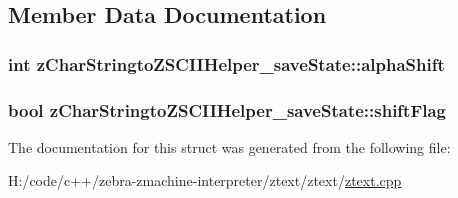 \subsection{Member Data Documentation}
\hypertarget{structz_char_stringto_z_s_c_i_i_helper__save_state_ab9261aec1a4da3630a85089ba3d7ad21}{
\subsubsection[{alpha\-Shift}]{\setlength{\rightskip}{0pt plus 5cm}int z\-Char\-Stringto\-Z\-S\-C\-I\-I\-Helper\-\_\-save\-State\-::alpha\-Shift}}\label{structz_char_stringto_z_s_c_i_i_helper__save_state_ab9261aec1a4da3630a85089ba3d7ad21}
\hypertarget{structz_char_stringto_z_s_c_i_i_helper__save_state_a9e1b07c9af1aa49e625608ff3e86cc35}{
\subsubsection[{shift\-Flag}]{\setlength{\rightskip}{0pt plus 5cm}bool z\-Char\-Stringto\-Z\-S\-C\-I\-I\-Helper\-\_\-save\-State\-::shift\-Flag}}\label{structz_char_stringto_z_s_c_i_i_helper__save_state_a9e1b07c9af1aa49e625608ff3e86cc35}


The documentation for this struct was generated from the following file\-:\begin{DoxyCompactItemize}
\item 
H\-:/code/c++/zebra-\/zmachine-\/interpreter/ztext/ztext/\hyperlink{ztext_8cpp}{ztext.\-cpp}\end{DoxyCompactItemize}
